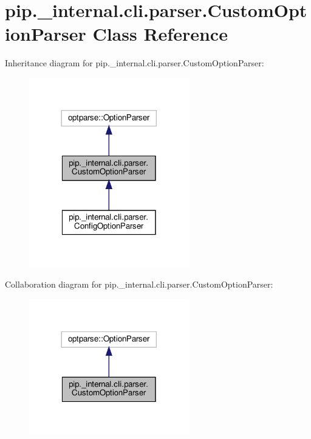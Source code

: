 \hypertarget{classpip_1_1__internal_1_1cli_1_1parser_1_1CustomOptionParser}{}\section{pip.\+\_\+internal.\+cli.\+parser.\+Custom\+Option\+Parser Class Reference}
\label{classpip_1_1__internal_1_1cli_1_1parser_1_1CustomOptionParser}


Inheritance diagram for pip.\+\_\+internal.\+cli.\+parser.\+Custom\+Option\+Parser\+:
\nopagebreak
\begin{figure}[H]
\begin{center}
\leavevmode
\includegraphics[width=197pt]{classpip_1_1__internal_1_1cli_1_1parser_1_1CustomOptionParser__inherit__graph}
\end{center}
\end{figure}


Collaboration diagram for pip.\+\_\+internal.\+cli.\+parser.\+Custom\+Option\+Parser\+:
\nopagebreak
\begin{figure}[H]
\begin{center}
\leavevmode
\includegraphics[width=197pt]{classpip_1_1__internal_1_1cli_1_1parser_1_1CustomOptionParser__coll__graph}
\end{center}
\end{figure}
